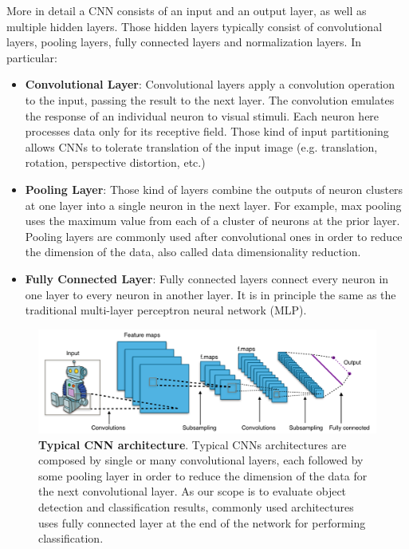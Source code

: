 More in detail a CNN consists of an input and an output layer, as well as multiple hidden layers. Those hidden layers typically consist of convolutional layers, pooling layers, fully connected layers and normalization layers. In particular:

\begin{itemize}
	\item \textbf{Convolutional Layer}: Convolutional layers apply a convolution operation to the input, passing the result to the next layer. The convolution emulates the response of an individual neuron to visual stimuli. Each neuron here processes data only for its receptive field. Those kind of input partitioning allows CNNs to tolerate translation of the input image (e.g. translation, rotation, perspective distortion, etc.)
	\item \textbf{Pooling Layer}: Those kind of layers combine the outputs of neuron clusters at one layer into a single neuron in the next layer. For example, max pooling uses the maximum value from each of a cluster of neurons at the prior layer. Pooling layers are commonly used after convolutional ones in order to reduce the dimension of the data, also called data dimensionality reduction.
	\item \textbf{Fully Connected Layer}: Fully connected layers connect every neuron in one layer to every neuron in another layer. It is in principle the same as the traditional multi-layer perceptron neural network (MLP).
\end{itemize}

\begin{figure}
    \centering
    \includegraphics[width=\textwidth]{figures/1_perception_and_sensing_in_robotics/typical_cnn}
    \caption{\textbf{Typical CNN architecture}. Typical CNNs architectures are composed by single or many convolutional layers, each followed by some pooling layer in order to reduce the dimension of the data for the next convolutional layer. As our scope is to evaluate object detection and classification results, commonly used architectures uses fully connected layer at the end of the network for performing classification.} 
    \label{fig:typical_cnn}
\end{figure}

